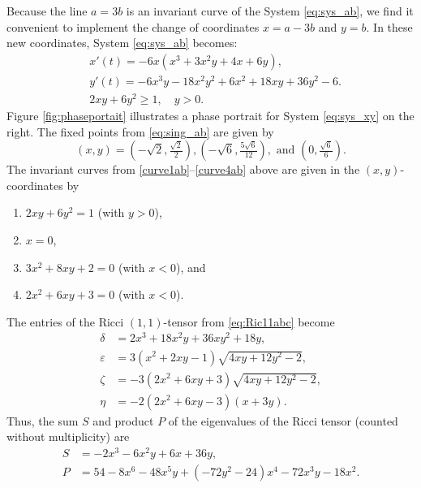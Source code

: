 \documentclass{amsart}
\let\epsilon\varepsilon
\numberwithin{equation}{section}
\theoremstyle{plain}
\theoremstyle{definition}
\theoremstyle{remark}
\numberwithin{table}{section}
\newcommand{\of}[1]{\left( #1 \right)}
\begin{document}
    Because the line $a=3b$ is an invariant curve of the System \eqref{eq:sys_ab}, we find it convenient to implement the change of coordinates $x= a - 3b$ and $y=b$.  In these new coordinates, System \eqref{eq:sys_ab} becomes:
    \begin{equation}\label{eq:sys_xy}
    \begin{aligned} 
        &
        x'(t) = -6x\left(x^3 + 3x^2 y + 4x + 6y\right), \\
        &
        y'(t) = -6x^3 y - 18x^2 y^2 + 6x^2 + 18x y + 36y^2 - 6. \\
        &
        2xy+6y^2\geq 1, \quad y>0  .
    \end{aligned}
    \end{equation}
    Figure \ref{fig:phaseportait} illustrates a phase portrait for System \eqref{eq:sys_xy} on the right. 
    The fixed points from \eqref{eq:sing_ab} are given by
    \begin{equation}\label{eq:sing_xy}
        (x,y) = \of{-\sqrt{2},\tfrac{\sqrt{2}}{2}}, \of{-\sqrt{6},\tfrac{5\sqrt{6}}{12}}, \text{ and } \of{0,\tfrac{\sqrt{6}}{6}}.
    \end{equation}
    The invariant curves from \eqref{curve1ab}--\eqref{curve4ab} above are given in the $(x,y)$-coordinates by
    \begin{enumerate}
        \item \label{curve1xy} $2xy + 6y^2 = 1$ (with $y>0$),
        \item \label{curve2xy} $x=0$,
        \item \label{curve3xy} $3x^2 + 8xy + 2 = 0$ (with $x<0$), and %
        \item \label{curve4xy} $2x^2 + 6xy + 3 = 0$ (with $x<0$). %
    \end{enumerate}
    The entries of the Ricci $(1,1)$-tensor from \eqref{eq:Ric11abc} become
    \begin{align*}
        \delta &= 2 x^3 + 18 x^2 y + 36 x y^2 + 18 y, \\
        \epsilon &= 3 (x^2 + 2 x y - 1) \sqrt{4 x y + 12 y^2 - 2} , \\
        \zeta &= -3 (2x^2 + 6 x y + 3) \sqrt{4 x y + 12 y^2 - 2} ,\\
        \eta &= -2 (2x^2 + 6 x y - 3) (x + 3 y).
    \end{align*}
    Thus, the sum $S$ and product $P$ of the eigenvalues of the Ricci tensor (counted without multiplicity) are 
    \begin{equation}\label{eq:Pxy}
    \begin{aligned}
        S &= -2 x^3 - 6 x^2 y + 6 x + 36 y,  \\
        P &= 54 - 8 x^6 - 48 x^5 y + (-72 y^2 - 24) x^4 - 72 x^3 y - 18 x^2.
    \end{aligned}
    \end{equation}
\end{document}
